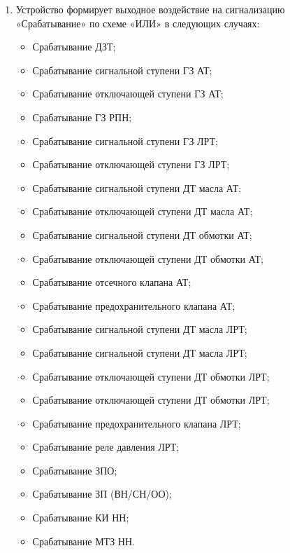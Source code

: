 \color{black}

\begin{enumerate}[label=\arabic{section}.\arabic{subsection}.\arabic*,  align=left, labelsep=4pt, leftmargin=0pt, itemindent=57pt]

\item
Устройство формирует выходное воздействие на сигнализацию «Срабатывание» по схеме «ИЛИ»
в следующих случаях:
\begin{itemize}
\item Срабатывание ДЗТ;
\item Срабатывание сигнальной ступени ГЗ АТ;
\item Срабатывание отключающей ступени ГЗ АТ;
\item Срабатывание ГЗ РПН;
\item Срабатывание сигнальной ступени ГЗ ЛРТ;
\item Срабатывание отключающей ступени ГЗ ЛРТ;
\item Срабатывание сигнальной ступени ДТ масла АТ;
\item Срабатывание отключающей ступени ДТ масла АТ;
\item Срабатывание сигнальной ступени  ДТ обмотки АТ;
\item Срабатывание отключающей ступени  ДТ обмотки АТ;
\item Срабатывание отсечного клапана АТ;
\item Срабатывание предохранительного клапана АТ;
\item Срабатывание сигнальной ступени ДТ масла ЛРТ;
\item Срабатывание сигнальной ступени ДТ масла ЛРТ;
\item Срабатывание отключающей ступени ДТ обмотки ЛРТ;
\item Срабатывание отключающей ступени ДТ обмотки ЛРТ;
\item Срабатывание предохранительного клапана ЛРТ;
\item Срабатывание реле давления ЛРТ;
\item Срабатывание ЗПО;
\item Срабатывание ЗП (ВН/СН/ОО);
\item Срабатывание КИ НН;
\item Срабатывание МТЗ НН.
\end{itemize}


\end{enumerate}
